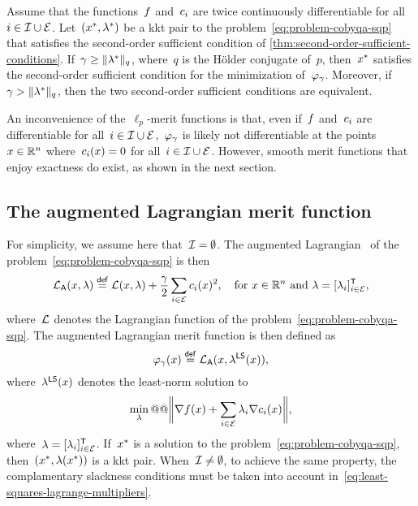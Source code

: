 \begin{theorem}
    \label{thm:exact-merit-function}
    Assume that the functions~$f$ and~$c_{i}$ are twice continuously differentiable for all~$i \in \mathcal{I} \cup \mathcal{E}$.
    Let~$(\iter[\ast], \lm[\ast])$ be a \gls{kkt} pair to the problem~\cref{eq:problem-cobyqa-sqp} that satisfies the second-order sufficient condition of \cref{thm:second-order-sufficient-conditions}.
    If~$\gamma \ge \norm{\lm[\ast]}_q$, where~$q$ is the H{\"{o}}lder conjugate of~$p$, then~$\iter[\ast]$ satisfies the second-order sufficient condition for the minimization of~$\merit_{\gamma}$.
    Moreover, if~$\gamma > \norm{\lm[\ast]}_q$, then the two second-order sufficient conditions are equivalent.
\end{theorem}

An inconvenience of the~$\ell_p$-merit functions is that, even if~$f$ and~$c_{i}$ are differentiable for all~$i \in \mathcal{I} \cup \mathcal{E}$,~$\merit_{\gamma}$ is likely not differentiable at the points~$\iter \in \R^n$ where~$\con{i}(\iter) = 0$ for all~$i \in \mathcal{I} \cup \mathcal{E}$.
However, smooth merit functions that enjoy exactness do exist, as shown in the next section.

\subsection{The augmented Lagrangian merit function}

For simplicity, we assume here that~$\mathcal{I} = \emptyset$.
The augmented Lagrangian~\cite{Hestenes_1969,Powell_1969,Rockafellar_1973,Rockafellar_2022} of the problem~\cref{eq:problem-cobyqa-sqp} is then
\begin{equation*}
    \auglag(\iter, \lm) \eqdef \lag(\iter, \lm) + \frac{\gamma}{2} \sum_{i \in \ieq} \con{i}(\iter)^2, \quad \text{for~$\iter \in \R^n$ and~$\lm = [\lm_i]_{i \in \ieq}^{\T}$,}
\end{equation*}
where~$\lag$ denotes the Lagrangian function of the problem~\cref{eq:problem-cobyqa-sqp}.
The augmented Lagrangian merit function is then defined as
\begin{equation*}
    \merit_{\gamma}(\iter) \eqdef \auglag(\iter, \lm[\mathsf{LS}](\iter)),
\end{equation*}
where~$\lm[\mathsf{LS}](\iter)$ denotes the least-norm solution to
\begin{equation}
    \label{eq:least-squares-lagrange-multipliers}
    \min_{\lm} @@ \norm[\bigg]{\nabla \obj(\iter) + \sum_{i \in \ieq} \lm_i \nabla \con{i}(x)},
\end{equation}
where~$\lm = [\lm_i]_{i \in \ieq}^{\T}$.
If~$\iter[\ast]$ is a solution to the problem~\cref{eq:problem-cobyqa-sqp}, then~$(\iter[\ast], \lm(\iter[\ast]))$ is a \gls{kkt} pair.
When~$\mathcal{I} \neq \emptyset$, to achieve the same property, the complamentary slackness conditions must be taken into account in~\cref{eq:least-squares-lagrange-multipliers}.

